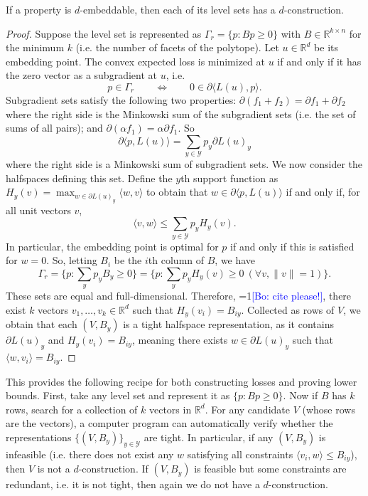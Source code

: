 \documentclass[anon,12pt]{colt2019}
\newcommand{\Comments}{1}
\newcommand{\mynote}[2]{\ifnum\Comments=1\textcolor{#1}{#2}\fi}
\newcommand{\bo}[1]{\mynote{blue}{[Bo: #1]}}
\newcommand{\reals}{\mathbb{R}}
\newcommand{\Y}{\mathcal{Y}}
\begin{document}
\begin{corollary}\label{cor:d-embed-implies-d-construction}
  If a property is $d$-embeddable, then each of its level sets has a $d$-construction.
\end{corollary}
\begin{proof}
  Suppose the level set is represented as $\Gamma_r = \{p : Bp \geq 0\}$ with $B \in \reals^{k \times n}$ for the minimum $k$ (i.e. the number of facets of the polytope).
  Let $u \in \reals^d$ be its embedding point.
  The convex expected loss is minimized at $u$ if and only if it has the zero vector as a subgradient at $u$, i.e.
    \[ p \in \Gamma_r \qquad \iff \qquad 0 \in \partial \langle L(u), p \rangle . \]
  Subgradient sets satisfy the following two properties: $\partial(f_1 + f_2) = \partial f_1 + \partial f_2$ where the right side is the Minkowski sum of the subgradient sets (i.e. the set of sums of all pairs); and $\partial(\alpha f_1) = \alpha \partial f_1$.
  So
    \[ \partial \langle p , L(u) \rangle = \sum_{y \in \Y} p_y \partial L(u)_y \]
  where the right side is a Minkowski sum of subgradient sets.
  We now consider the halfspaces defining this set.
  Define the $y$th support function as $H_y(v) = \max_{w \in \partial L(u)_y} \langle w, v \rangle$ to obtain that $w \in \partial \langle p, L(u) \rangle$ if and only if, for all unit vectors $v$,
   \[ \langle v, w \rangle \leq \sum_{y \in \Y} p_y H_y(v) . \]
  In particular, the embedding point is optimal for $p$ if and only if this is satisfied for $w=0$.
  So, letting $B_i$ be the $i$th column of $B$, we have
    \[ \Gamma_r = \{p : \sum_y p_y B_y \geq 0\} = \{p : \sum_y p_y H_y(v) \geq 0 ~ (\forall v, \|v\|=1)\} . \]
  These sets are equal and full-dimensional.
  Therefore, \bo{cite please!}, there exist $k$ vectors $v_1,\dots,v_k \in \reals^d$ such that $H_y(v_i) = B_{iy}$.
  Collected as rows of $V$, we obtain that each $(V,B_y)$ is a tight halfspace representation, as it contains $\partial L(u)_y$ and $H_y(v_i) = B_{iy}$, meaning there exists $w \in \partial L(u)_y$ such that $\langle w, v_i \rangle = B_{iy}$.
\end{proof}
This provides the following recipe for both constructing losses and proving lower bounds.
First, take any level set and represent it as $\{p : Bp \geq 0\}$.
Now if $B$ has $k$ rows, search for a collection of $k$ vectors in $\reals^d$.
For any candidate $V$ (whose rows are the vectors), a computer program can automatically verify whether the representations $\{(V,B_y)\}_{y \in \Y}$ are tight.
In particular, if any $(V,B_y)$ is infeasible (i.e. there does not exist any $w$ satisfying all constraints $\langle v_i, w \rangle \leq B_{iy}$), then $V$ is not a $d$-construction.
If $(V,B_y)$ is feasible but some constraints are redundant, i.e. it is not tight, then again we do not have a $d$-construction.
\end{document}
